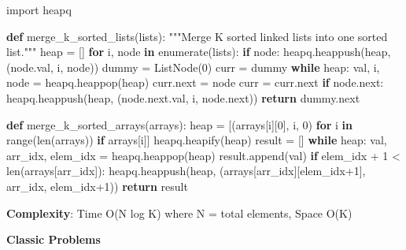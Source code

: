 \documentclass[11pt]{article}
\newenvironment{Shaded}{\begin{snugshade}}{\end{snugshade}}
\newcommand{\BuiltInTok}[1]{\textcolor[rgb]{0.50,0.55,0.55}{#1}}
\newcommand{\CommentTok}[1]{\textcolor[rgb]{0.48,0.49,0.49}{#1}}
\newcommand{\ControlFlowTok}[1]{\textcolor[rgb]{0.99,0.74,0.29}{\textbf{#1}}}
\newcommand{\DecValTok}[1]{\textcolor[rgb]{0.96,0.45,0.00}{#1}}
\newcommand{\ImportTok}[1]{\textcolor[rgb]{0.15,0.68,0.38}{#1}}
\newcommand{\KeywordTok}[1]{\textcolor[rgb]{0.81,0.81,0.76}{\textbf{#1}}}
\newcommand{\NormalTok}[1]{\textcolor[rgb]{0.81,0.81,0.76}{#1}}
\newcommand{\OperatorTok}[1]{\textcolor[rgb]{0.81,0.81,0.76}{#1}}
\begin{document}
\begin{Shaded}
\begin{Highlighting}[]
\ImportTok{import}\NormalTok{ heapq}

\KeywordTok{def}\NormalTok{ merge\_k\_sorted\_lists(lists):}
    \CommentTok{"""Merge K sorted linked lists into one sorted list."""}
\NormalTok{    heap }\OperatorTok{=}\NormalTok{ []}
    \ControlFlowTok{for}\NormalTok{ i, node }\KeywordTok{in} \BuiltInTok{enumerate}\NormalTok{(lists):}
        \ControlFlowTok{if}\NormalTok{ node:}
\NormalTok{            heapq.heappush(heap, (node.val, i, node))}
\NormalTok{    dummy }\OperatorTok{=}\NormalTok{ ListNode(}\DecValTok{0}\NormalTok{)}
\NormalTok{    curr }\OperatorTok{=}\NormalTok{ dummy}
    \ControlFlowTok{while}\NormalTok{ heap:}
\NormalTok{        val, i, node }\OperatorTok{=}\NormalTok{ heapq.heappop(heap)}
\NormalTok{        curr.}\BuiltInTok{next} \OperatorTok{=}\NormalTok{ node}
\NormalTok{        curr }\OperatorTok{=}\NormalTok{ curr.}\BuiltInTok{next}
        \ControlFlowTok{if}\NormalTok{ node.}\BuiltInTok{next}\NormalTok{:}
\NormalTok{            heapq.heappush(heap, (node.}\BuiltInTok{next}\NormalTok{.val, i, node.}\BuiltInTok{next}\NormalTok{))}
    \ControlFlowTok{return}\NormalTok{ dummy.}\BuiltInTok{next}

\KeywordTok{def}\NormalTok{ merge\_k\_sorted\_arrays(arrays):}
\NormalTok{    heap }\OperatorTok{=}\NormalTok{ [(arrays[i][}\DecValTok{0}\NormalTok{], i, }\DecValTok{0}\NormalTok{) }\ControlFlowTok{for}\NormalTok{ i }\KeywordTok{in} \BuiltInTok{range}\NormalTok{(}\BuiltInTok{len}\NormalTok{(arrays)) }\ControlFlowTok{if}\NormalTok{ arrays[i]]}
\NormalTok{    heapq.heapify(heap)}
\NormalTok{    result }\OperatorTok{=}\NormalTok{ []}
    \ControlFlowTok{while}\NormalTok{ heap:}
\NormalTok{        val, arr\_idx, elem\_idx }\OperatorTok{=}\NormalTok{ heapq.heappop(heap)}
\NormalTok{        result.append(val)}
        \ControlFlowTok{if}\NormalTok{ elem\_idx }\OperatorTok{+} \DecValTok{1} \OperatorTok{\textless{}} \BuiltInTok{len}\NormalTok{(arrays[arr\_idx]):}
\NormalTok{            heapq.heappush(heap, (arrays[arr\_idx][elem\_idx}\OperatorTok{+}\DecValTok{1}\NormalTok{], arr\_idx, elem\_idx}\OperatorTok{+}\DecValTok{1}\NormalTok{))}
    \ControlFlowTok{return}\NormalTok{ result}
\end{Highlighting}
\end{Shaded}

\textbf{Complexity}: Time O(N log K) where N = total elements, Space O(K)

\textbf{Classic Problems}
\end{document}
